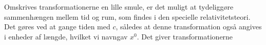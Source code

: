 %
Omskrives transformationerne en lille smule, er det muligt at tydeliggøre sammenhængen mellem tid og rum, som findes i den specielle relativitetsteori.
Det gøres ved at gange tiden med $c$, således at denne transformation også angives i enheder af længde, hvilket vi navngav $x^0$.
Det giver transformationerne








